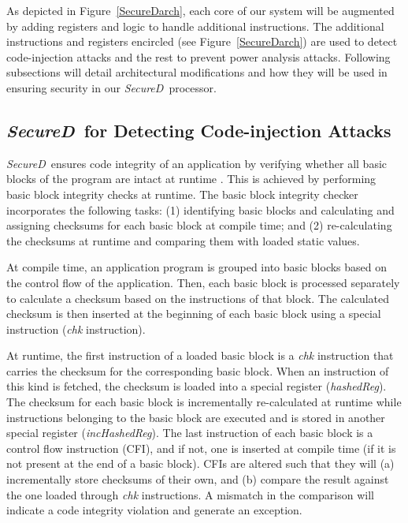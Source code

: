 \documentclass{article}
\newcommand{\SecureD}{\emph{SecureD}}
\begin{document}
As depicted in Figure~\ref{SecureDarch}, each core of our system will
be augmented by adding registers and logic to       handle additional
instructions. The additional  instructions and  registers   encircled
(see Figure~\ref{SecureDarch}) are used      to detect code-injection
attacks and the rest to  prevent   power  analysis attacks. Following
subsections will detail architectural modifications and how they will
be used in ensuring security in our \SecureD\ processor.

\subsection{\SecureD\ for Detecting Code-injection Attacks} \label{impres-arch}
\SecureD\ ensures  code   integrity   of an application by  verifying
whether  all  basic   blocks     of the program are intact at runtime
\cite{ragel06impres}. This is achieved    by         performing basic
block integrity checks at runtime. The basic block  integrity checker
incorporates  the following       tasks: (1) identifying basic blocks
and calculating and assigning checksums  for  each  basic  block   at
compile time; and (2) re-calculating the checksums at runtime     and
comparing them with loaded static values.

At compile time, an application program is grouped into basic  blocks
based on the control flow of the application. Then,  each basic block
is  processed       separately to calculate a checksum  based  on the 
instructions  of  that  block.  The  calculated   checksum    is then
inserted at the beginning  of  each  basic   block  using  a  special
instruction (\emph{chk} instruction). 

At runtime, the first instruction of a loaded   basic     block is  a
\emph{chk}   instruction   that    carries    the    checksum for the 
corresponding  basic  block.  When  an instruction   of  this kind is
fetched, the  checksum   is   loaded    into     a  special  register
(\textit{hashedReg}). The checksum  for each basic block is incrementally
re-calculated  at  runtime while instructions  belonging to the basic
block  are     executed    and  is stored in another special register
(\textit{incHashedReg}). The last instruction of each basic block   is  a
control  flow  instruction  (CFI), and if not, one is inserted at compile time (if  it
is not present at the end of a basic block). CFIs  are  altered  such
that they will (a) incrementally store checksums of their own, and (b)
compare the  result   against          the one loaded through \emph{chk}
instructions. A mismatch  in the comparison  will indicate     a code
integrity violation and generate an exception.
\end{document}
